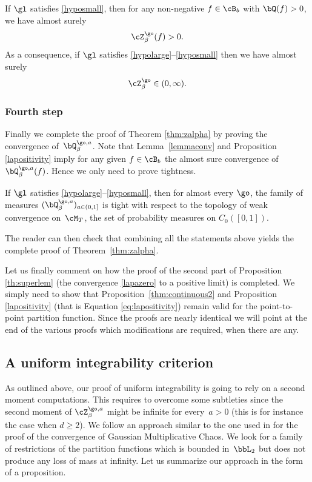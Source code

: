 \begin{proposition}\label{lapositivity}
If $\gl$ satisfies \eqref{hyposmall}, then for any non-negative $f\in \cB_b$ with $\bQ(f)>0$,
we have almost surely
\begin{equation}
\cZ^{\go }_{\beta}(f)>0.
\end{equation}
As a consequence, if $\gl$ satisfies \eqref{hypolarge}--\eqref{hyposmall} then we have almost surely
\begin{equation}
\label{eq:lapositivity}
\cZ^{\go }_{\beta} \in (0,\infty).
\end{equation}
\end{proposition}

\subsubsection*{Fourth step}
Finally we complete the proof of Theorem \ref{thm:zalpha} by proving the convergence of~$\bQ^{\go,a}_{\beta}$. Note that Lemma~\ref{lemmaconv} and Proposition \ref{lapositivity} imply for any given $f\in \cB_b$ the almost sure convergence of $\bQ^{\go,a}_{\beta}(f)$. Hence we only need to prove tightness.

\begin{proposition}\label{proptight}
If $\gl$ satisfies \eqref{hypolarge}--\eqref{hyposmall},
then for almost every $\go$, the family of measures $(\bQ^{\go,a}_{\beta})_{a\in(0,1]}$ is tight
with respect to the topology of weak convergence on~$\cM_T$,
the set of probability measures on $C_0([0,1])$.
\end{proposition}

 The reader can then check that combining all the statements above yields the complete proof of Theorem~\ref{thm:zalpha}.

Let us finally comment on how the proof of the second part of Proposition \ref{th:superlem} (the convergence \eqref{lapazero} to a positive limit) is completed.
We simply need to show that Proposition~\ref{thm:continuous2} and Proposition \ref{lapositivity} (that is Equation \eqref{eq:lapositivity})
remain valid for the point-to-point partition function.
Since the proofs are nearly identical we will point at the end of the various proofs which modifications are required, when there are any.

\subsection{A uniform integrability criterion}
\label{sec:uniformcriterion}
As outlined above, our proof of uniform integrability is going to rely on a second moment computations. This requires to overcome some subtleties since the second moment of $\cZ^{\go,a}_{\beta}$ might be infinite for every~$a>0$ (this is for instance the case when $d\ge 2$).
We follow an approach similar to the one used in \cite{ber2017} for the proof of the convergence of Gaussian Multiplicative Chaos. We look for a family of restrictions of the partition functions which is bounded in~$\bbL_2$ but does not produce any loss of mass at infinity.
Let us summarize our approach in the form of a proposition.

